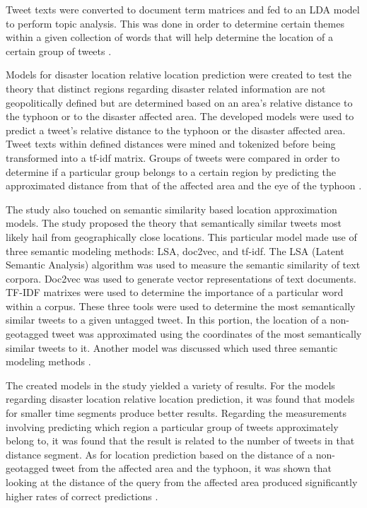 Tweet texts were converted to document term matrices and fed to an LDA model to perform topic analysis. This was done in order to determine certain themes within a given collection of words that will help determine the location of a certain group of tweets \cite{ROSALES2017}.

Models for disaster location relative location prediction were created to test the theory that distinct regions regarding disaster related information are not geopolitically defined but are determined based on an area’s relative distance to the typhoon or to the disaster affected area. The developed models were used to predict a tweet’s relative distance to the typhoon or the disaster affected area. Tweet texts within defined distances were mined and tokenized before being transformed into a tf-idf matrix. Groups of tweets were compared in order to determine if a particular group belongs to a certain region by predicting the approximated distance from that of the affected area and the eye of the typhoon \cite{ROSALES2017}.

The study also touched on semantic similarity based location approximation models. The study proposed the theory that semantically similar tweets most likely hail from geographically close locations. This particular model made use of three semantic modeling methods: LSA, doc2vec, and tf-idf. The LSA (Latent Semantic Analysis) algorithm was used to measure the semantic similarity of text corpora. Doc2vec was used to generate vector representations of text documents. TF-IDF matrixes were used to determine the importance of a particular word within a corpus. These three tools were used to determine the most semantically similar tweets to a given untagged tweet. In this portion, the location of a non-geotagged tweet was approximated using the coordinates of the most semantically similar tweets to it. Another model was discussed which used three semantic modeling methods \cite{ROSALES2017}.

The created models in the study yielded a variety of results. For the models regarding disaster location relative location prediction, it was found that models for smaller time segments produce better results. Regarding the measurements involving predicting which region a particular group of tweets approximately belong to, it was found that the result is related to the number of tweets in that distance segment. As for location prediction based on the distance of a non-geotagged tweet from the affected area and the typhoon, it was shown that looking at the distance of the query from the affected area produced significantly higher rates of correct predictions \cite{ROSALES2017}. 

